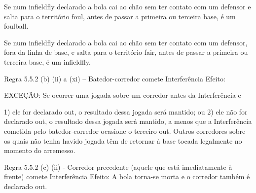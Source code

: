  Se num \gls{infieldfly} declarado a bola cai ao chão sem ter contato com um defensor e salta para o território \gls{foul}, antes de passar a primeira ou terceira base, é um \gls{foulball}.

 Se num \gls{infieldfly} declarado a bola cai ao chão sem ter contato com um defensor, fora da linha de base, e salta para o território \gls{fair}, antes de passar a primeira ou terceira base, é um \gls{infieldfly}.

 Regra 5.5.2 (b) (ii) a (xi) -- Batedor-corredor comete Interferência
 Efeito:

 EXCEÇÃO: Se ocorrer uma jogada sobre um corredor antes da Interferência e

 1) ele for declarado \gls{out}, o resultado dessa jogada será mantido; ou
 2) ele não for declarado \gls{out}, o resultado dessa jogada será mantido, a menos que a Interferência cometida pelo batedor-corredor ocasione o terceiro \gls{out}. Outros corredores sobre os quais não tenha havido jogada têm de retornar à base tocada legalmente no momento do arremesso.

 Regra 5.5.2 (c) (ii) - Corredor precedente (aquele que está imediatamente à frente) comete Interferência
 Efeito: A bola torna-se morta e o corredor também é declarado \gls{out}.


